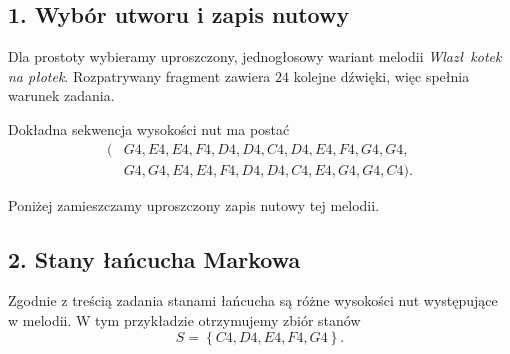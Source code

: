 \documentclass[11pt,a4paper]{article}
\newcommand{\set}[1]{\left\{ #1 \right\}}
\theoremstyle{plain}
\theoremstyle{definition}
\newcommand{\stafflines}[2]{%
    \foreach \yy in {0,0.5,1,1.5,2} {
        \draw[gray!70] (0,{#1+\yy}) -- (#2,{#1+\yy});
    }
}
\newcommand{\quarternote}[2]{%
    \filldraw[fill=white] (#1,#2) ellipse (0.16 and 0.11);
    \draw ({#1+0.16},#2) -- ({#1+0.16},{#2+1.1});
}
\newcommand{\ledgernote}[2]{%
    \filldraw[fill=white] (#1,#2) ellipse (0.16 and 0.11);
    \draw ({#1-0.28},#2) -- ({#1+0.28},#2);
    \draw ({#1+0.16},#2) -- ({#1+0.16},{#2+1.1});
}
\begin{document}
\begin{rozwiazaniebox}
\subsection*{1. Wyb\'or utworu i zapis nutowy}

Dla prostoty wybieramy uproszczony, jednog\l osowy wariant melodii \emph{Wlaz\l\ kotek na p\l otek}.
Rozpatrywany fragment zawiera \(24\) kolejne d\'zwi\k{e}ki, wi\k{e}c spe\l nia warunek zadania.

Dok\l adna sekwencja wysoko\'sci nut ma posta\'c
\[
\begin{aligned}
    (&G4,E4,E4,F4,D4,D4,C4,D4,E4,F4,G4,G4,\\
     &G4,G4,E4,E4,F4,D4,D4,C4,E4,G4,G4,C4).
\end{aligned}
\]

Poni\.zej zamieszczamy uproszczony zapis nutowy tej melodii.

\begin{center}
\end{center}

\subsection*{2. Stany \l a\'ncucha Markowa}

Zgodnie z tre\'sci\k{a} zadania stanami \l a\'ncucha s\k{a} r\'o\.zne wysoko\'sci nut wyst\k{e}puj\k{a}ce
w melodii. W tym przyk\l adzie otrzymujemy zbi\'or stan\'ow
\[
    S=\set{C4,D4,E4,F4,G4}.
\]


\end{rozwiazaniebox}
\end{document}
